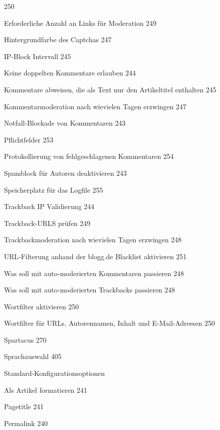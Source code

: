 \documentclass{book}
\renewcommand\subitem{\par}
\renewcommand\subsubitem{\par\hspace*{3mm}}
\begin{document}
\begin{multicols}{2}
\begin{osp-index}
		250
      \subsubitem Erforderliche Anzahl an Links f\"ur Moderation\hspace{1mm} 
		249
      \subsubitem Hintergrundfarbe des Captchas\hspace{1mm} 247
      \subsubitem IP-Block Intervall\hspace{1mm} 245
      \subsubitem Keine doppelten Kommentare erlauben\hspace{1mm} 244
      \subsubitem Kommentare abweisen, die als Text nur den Artikeltitel enthalten\hspace{1mm} 
		245
      \subsubitem Kommentarmoderation nach wievielen Tagen erzwingen\hspace{1mm} 
		247
      \subsubitem Notfall-Blockade von Kommentaren\hspace{1mm} 243
      \subsubitem Pflichtfelder\hspace{1mm} 253
      \subsubitem Protokollierung von fehlgeschlagenen Kommentaren\hspace{1mm} 
		254
      \subsubitem Spamblock f\"ur Autoren deaktivieren\hspace{1mm} 243
      \subsubitem Speicherplatz f\"ur das Logfile\hspace{1mm} 255
      \subsubitem Trackback IP Validierung\hspace{1mm} 244
      \subsubitem Trackback-URLS pr\"ufen\hspace{1mm} 249
      \subsubitem Trackbackmoderation nach wievielen Tagen erzwingen\hspace{1mm} 
		248
      \subsubitem URL-Filterung anhand der blogg.de Blacklist aktivieren\hspace{1mm} 
		251
      \subsubitem Was soll mit auto-moderierten Kommentaren passieren\hspace{1mm} 
		248
      \subsubitem Was soll mit auto-moderierten Trackbacks passieren\hspace{1mm} 
		248
      \subsubitem Wortfilter aktivieren\hspace{1mm} 250
      \subsubitem Wortfilter f\"ur URLs, Autorennamen, Inhalt und E-Mail-Adressen\hspace{1mm} 
		250
    \subitem Spartacus\hspace{1mm} 270
    \subitem Sprachauswahl\hspace{1mm} 405
    \subitem Standard-Konfigurationsoptionen
      \subsubitem Als Artikel formatieren\hspace{1mm} 241
      \subsubitem Pagetitle\hspace{1mm} 241
      \subsubitem Permalink\hspace{1mm} 240

\end{osp-index}
\end{multicols}
\end{document}

